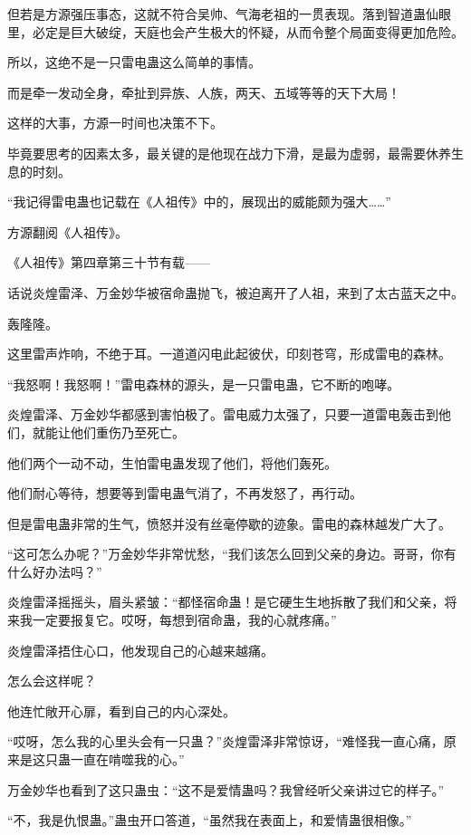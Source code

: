 \begin{this_body}
但若是方源强压事态，这就不符合吴帅、气海老祖的一贯表现。落到智道蛊仙眼里，必定是巨大破绽，天庭也会产生极大的怀疑，从而令整个局面变得更加危险。

所以，这绝不是一只雷电蛊这么简单的事情。

而是牵一发动全身，牵扯到异族、人族，两天、五域等等的天下大局！

这样的大事，方源一时间也决策不下。

毕竟要思考的因素太多，最关键的是他现在战力下滑，是最为虚弱，最需要休养生息的时刻。

“我记得雷电蛊也记载在《人祖传》中的，展现出的威能颇为强大……”

方源翻阅《人祖传》。

《人祖传》第四章第三十节有载——

话说炎煌雷泽、万金妙华被宿命蛊抛飞，被迫离开了人祖，来到了太古蓝天之中。

轰隆隆。

这里雷声炸响，不绝于耳。一道道闪电此起彼伏，印刻苍穹，形成雷电的森林。

“我怒啊！我怒啊！”雷电森林的源头，是一只雷电蛊，它不断的咆哮。

炎煌雷泽、万金妙华都感到害怕极了。雷电威力太强了，只要一道雷电轰击到他们，就能让他们重伤乃至死亡。

他们两个一动不动，生怕雷电蛊发现了他们，将他们轰死。

他们耐心等待，想要等到雷电蛊气消了，不再发怒了，再行动。

但是雷电蛊非常的生气，愤怒并没有丝毫停歇的迹象。雷电的森林越发广大了。

“这可怎么办呢？”万金妙华非常忧愁，“我们该怎么回到父亲的身边。哥哥，你有什么好办法吗？”

炎煌雷泽摇摇头，眉头紧皱：“都怪宿命蛊！是它硬生生地拆散了我们和父亲，将来我一定要报复它。哎呀，每想到宿命蛊，我的心就疼痛。”

炎煌雷泽捂住心口，他发现自己的心越来越痛。

怎么会这样呢？

他连忙敞开心扉，看到自己的内心深处。

“哎呀，怎么我的心里头会有一只蛊？”炎煌雷泽非常惊讶，“难怪我一直心痛，原来是这只蛊一直在啃噬我的心。”

万金妙华也看到了这只蛊虫：“这不是爱情蛊吗？我曾经听父亲讲过它的样子。”

“不，我是仇恨蛊。”蛊虫开口答道，“虽然我在表面上，和爱情蛊很相像。”


\end{this_body}
